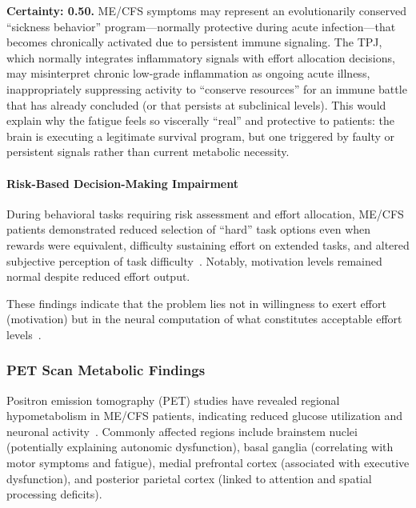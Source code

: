 \begin{hypothesis}
\label{hyp:maladaptive-sickness-behavior}
\textbf{Certainty: 0.50.} ME/CFS symptoms may represent an evolutionarily conserved ``sickness behavior'' program---normally protective during acute infection---that becomes chronically activated due to persistent immune signaling. The TPJ, which normally integrates inflammatory signals with effort allocation decisions, may misinterpret chronic low-grade inflammation as ongoing acute illness, inappropriately suppressing activity to ``conserve resources'' for an immune battle that has already concluded (or that persists at subclinical levels). This would explain why the fatigue feels so viscerally ``real'' and protective to patients: the brain is executing a legitimate survival program, but one triggered by faulty or persistent signals rather than current metabolic necessity.
\end{hypothesis}

\paragraph{Risk-Based Decision-Making Impairment}
During behavioral tasks requiring risk assessment and effort allocation, ME/CFS patients demonstrated reduced selection of ``hard'' task options even when rewards were equivalent, difficulty sustaining effort on extended tasks, and altered subjective perception of task difficulty~\cite{walitt2024deep}. Notably, motivation levels remained normal despite reduced effort output.

These findings indicate that the problem lies not in willingness to exert effort (motivation) but in the neural computation of what constitutes acceptable effort levels~\cite{walitt2024deep}.

\subsubsection{PET Scan Metabolic Findings}

Positron emission tomography (PET) studies have revealed regional hypometabolism in ME/CFS patients, indicating reduced glucose utilization and neuronal activity~\cite{Chaudhuri2004fatigue}. Commonly affected regions include brainstem nuclei (potentially explaining autonomic dysfunction), basal ganglia (correlating with motor symptoms and fatigue), medial prefrontal cortex (associated with executive dysfunction), and posterior parietal cortex (linked to attention and spatial processing deficits).

